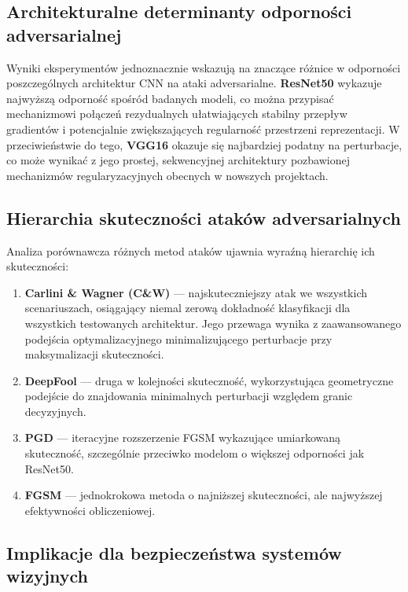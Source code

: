 \documentclass[12pt]{article}
\begin{document}
\subsection{Architekturalne determinanty odporności adversarialnej}

Wyniki eksperymentów jednoznacznie wskazują na znaczące różnice w odporności poszczególnych architektur CNN na ataki adversarialne. \textbf{ResNet50} wykazuje najwyższą odporność spośród badanych modeli, co można przypisać mechanizmowi połączeń rezydualnych ułatwiających stabilny przepływ gradientów i potencjalnie zwiększających regularność przestrzeni reprezentacji. W przeciwieństwie do tego, \textbf{VGG16} okazuje się najbardziej podatny na perturbacje, co może wynikać z jego prostej, sekwencyjnej architektury pozbawionej mechanizmów regularyzacyjnych obecnych w nowszych projektach.

\subsection{Hierarchia skuteczności ataków adversarialnych}

Analiza porównawcza różnych metod ataków ujawnia wyraźną hierarchię ich skuteczności:

\begin{enumerate}
    \item \textbf{Carlini \& Wagner (C\&W)} --- najskuteczniejszy atak we wszystkich scenariuszach, osiągający niemal zerową dokładność klasyfikacji dla wszystkich testowanych architektur. Jego przewaga wynika z zaawansowanego podejścia optymalizacyjnego minimalizującego perturbacje przy maksymalizacji skuteczności.
    
    \item \textbf{DeepFool} --- druga w kolejności skuteczność, wykorzystująca geometryczne podejście do znajdowania minimalnych perturbacji względem granic decyzyjnych.
    
    \item \textbf{PGD} --- iteracyjne rozszerzenie FGSM wykazujące umiarkowaną skuteczność, szczególnie przeciwko modelom o większej odporności jak ResNet50.
    
    \item \textbf{FGSM} --- jednokrokowa metoda o najniższej skuteczności, ale najwyższej efektywności obliczeniowej.
\end{enumerate}

\subsection{Implikacje dla bezpieczeństwa systemów wizyjnych}
\end{document}
